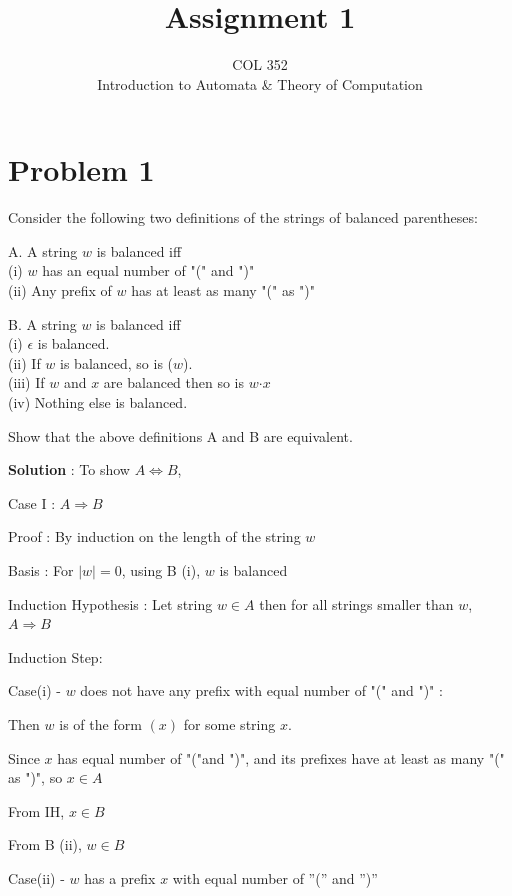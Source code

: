 \documentclass{article}
\title{Assignment 1}
\author{COL 352\\
    Introduction to Automata \& 
    Theory of Computation}
\date{}
\begin{document}
    \maketitle
    
    \section*{Problem 1} Consider the following two definitions of the strings of balanced parentheses:
    
    A. A string $w$ is balanced iff \\
    (i) $w$ has an equal number of "(" and ")"\\
    (ii) Any prefix of $w$ has at least as many "(" as ")"
    
    B. A string $w$ is balanced iff\\
    (i) $\epsilon $ is balanced.\\
    (ii) If $w$ is balanced, so is ($w$).\\
    (iii) If $w$ and $x$ are balanced then so is $w\textrm{·}x$\\
    (iv) Nothing else is balanced.
    
    Show that the above definitions A and B are equivalent.
    
    
    \textbf{Solution} : To show $A \iff B$,
    
    Case I : $A \Longrightarrow B$
    
    Proof : By induction on the length of the string $w$
    
    Basis : For $|w| = 0$, using B (i), $w$ is balanced
    
    Induction Hypothesis : Let string $w \in A$ then for all strings smaller than $w$, $A \Longrightarrow B$
    
    Induction Step:
    
    \quad Case(i) - $w$ does not have any prefix with equal number of "(" and ")" : 
    
    \qquad Then $w$ is of the form $( x )$ for some string $x$. 
    
    \qquad Since $x$ has equal number of "("and ")", and its prefixes have at least as many "(" as ")", so $x \in A$
    
    \qquad From IH,  $x \in B$
    
    \qquad From B (ii),  $w \in B$
    
    
    
    \quad Case(ii) - $w$ has a prefix $x$ with equal number of ”(” and ”)”
    
\end{document}
